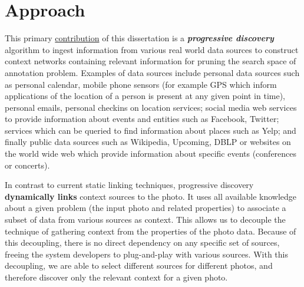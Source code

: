 \section{Approach}
This primary \uline{contribution} of this dissertation is a \textbf{\textit{progressive discovery}} algorithm to ingest information from various real world data sources to construct context networks containing relevant information for pruning the search space of annotation problem. Examples of data sources include personal data sources such as personal calendar, mobile phone sensors (for example GPS which inform applications of the location of a person is present at any given point in time), personal emails, personal checkins on location services; social media web services to provide information about events and entities such as Facebook, Twitter; services which can be queried to find information about places such as Yelp; and finally public data sources such as Wikipedia, Upcoming, DBLP or websites on the world wide web which provide information about specific events (conferences or concerts).

In contrast to current static linking techniques, progressive discovery \textbf{dynamically links} context sources to the photo. It uses all available knowledge about a given problem (the input photo and related properties) to associate a subset of data from various sources as context. This allows us to decouple the technique of gathering context from the properties of the photo data. Because of this decoupling, there is no direct dependency on any specific set of sources, freeing the system developers to plug-and-play with various sources. With this decoupling, we are able to select different sources for different photos, and therefore discover only the relevant context for a given photo.



